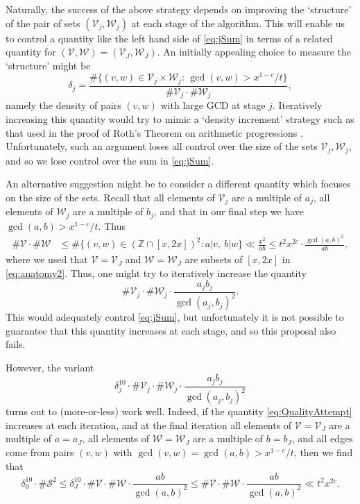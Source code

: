 \documentclass[12pt]{amsart}
\numberwithin{equation}{section}
\theoremstyle{definition}
\theoremstyle{remark}
\newcommand{\Z}{\mathbb{Z}}
\newcommand{\CS}{\mathcal{S}}
\newcommand{\CV}{\mathcal{V}}
\newcommand{\CW}{\mathcal{W}}
\newcommand{\al}[1]{\begin{align} #1 \end{align} }
\renewcommand{\le}{\leqslant}
\begin{document}
Naturally, the success of the above strategy depends on improving the `structure' of the pair of sets $(\CV_j,\CW_j)$ at each stage of the algorithm. This will enable us to control a quantity like the left hand side of \eqref{eq:jSum} in terms of a related quantity for $(\CV,\CW)=(\CV_J,\CW_J)$. An initially appealing choice to measure the `structure' might be
\[
\delta_j=\frac{\#\{(v,w)\in\CV_j\times\CW_j:\, \gcd(v,w)>x^{1-c}/t\}}{\#\CV_j\cdot \#\CW_j},
\]
namely the density of pairs $(v,w)$ with large GCD at stage $j$. Iteratively increasing this quantity would try to mimic a `density increment' strategy such as that used in the proof of Roth's Theorem on arithmetic progressions \cite{roth1,roth2}. Unfortunately, such an argument loses all control over the size of the sets $\CV_j,\CW_j$, and so we lose control over the sum in \eqref{eq:jSum}.


An alternative suggestion might be to consider a different quantity which focuses on the size of the sets. Recall that all elements of $\CV_j$ are a multiple of $a_j$, all elements of $\CW_j$ are a multiple of $b_j$, and that in our final step we have $\gcd(a,b)>x^{1-c}/t$. Thus
\al{
\label{eq:anatomy2}
\#\CV\cdot \#\CW 
	&\le \#\{(v,w)\in(\Z\cap[x,2x])^2 : a|v,\ b|w\}  \ll \frac{x^2}{ab} \le  t^2 x^{2c}\cdot \frac{\gcd(a,b)^2}{ab} ,
}
where we used that $\CV=\CV_J$ and $\CW=\CW_J$ are subsets of $[x,2x]$ in \eqref{eq:anatomy2}. Thus, one might try to iteratively increase the quantity
\[
\#\CV_j\cdot \#\CW_j\cdot  \frac{a_jb_j}{\gcd(a_j,b_j)^2}.
\]
This would adequately control \eqref{eq:jSum}, but unfortunately it is not possible to guarantee that this quantity increases at each stage, and so this proposal also fails.

However, the variant
\begin{equation}
\delta_j^{10}\cdot \#\CV_j\cdot \#\CW_j \cdot\frac{a_jb_j}{\gcd(a_j,b_j)^2} 
\label{eq:QualityAttempt}
\end{equation}
turns out to (more-or-less) work well. Indeed, if the quantity \eqref{eq:QualityAttempt} increases at each iteration, and at the final iteration all elements of $\CV=\CV_J$ are a multiple of $a=a_J$, all elements of $\CW=\CW_J$ are a multiple of $b=b_J$, and all edges come from pairs $(v,w)$ with $\gcd(v,w)=\gcd(a,b)>x^{1-c}/t$, then we find that
\begin{equation}
\delta_0^{10}\cdot \#\CS^2\le \delta_J^{10}\cdot \#\CV\cdot \#\CW\cdot \frac{ab}{\gcd(a,b)^2}
	\le \#\CV\cdot \#\CW \cdot \frac{ab}{\gcd(a,b)^2}\ll t^2x^{2c}.
\label{eq:IterationBound1}
\end{equation}
\end{document}
